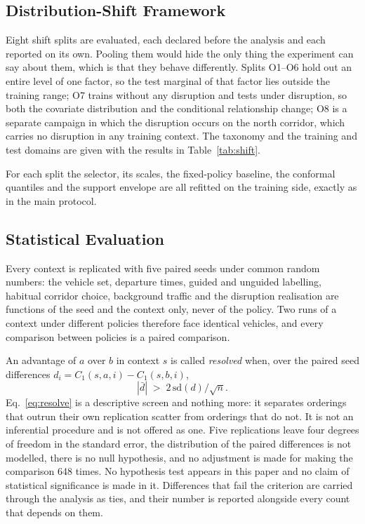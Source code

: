 \subsection{Distribution-Shift Framework}
\label{sec:method:shift}

Eight shift splits are evaluated, each declared before the analysis and each
reported on its own. Pooling them would hide the only thing the experiment can
say about them, which is that they behave differently. Splits O1--O6 hold out an
entire level of one factor, so the test marginal of that factor lies outside the
training range; O7 trains without any disruption and tests under disruption, so
both the covariate distribution and the conditional relationship change; O8 is a
separate campaign in which the disruption occurs on the north corridor, which
carries no disruption in any training context. The taxonomy and the training and
test domains are given with the results in Table~\ref{tab:shift}.

For each split the selector, its scales, the fixed-policy baseline, the conformal
quantiles and the support envelope are all refitted on the training side, exactly
as in the main protocol.

\subsection{Statistical Evaluation}
\label{sec:method:stats}

Every context is replicated with five paired seeds under common random numbers:
the vehicle set, departure times, guided and unguided labelling, habitual
corridor choice, background traffic and the disruption realisation are functions
of the seed and the context only, never of the policy. Two runs of a context
under different policies therefore face identical vehicles, and every comparison
between policies is a paired comparison.

An advantage of $a$ over $b$ in context $s$ is called \emph{resolved} when, over
the paired seed differences $d_i = C_1(s,a,i) - C_1(s,b,i)$,
\begin{equation}
|\bar d| \;>\; 2\, \mathrm{sd}(d)/\sqrt{n}.
\label{eq:resolve}
\end{equation}
Eq.~\eqref{eq:resolve} is a descriptive screen and nothing more: it separates
orderings that outrun their own replication scatter from orderings that do not.
It is not an inferential procedure and is not offered as one. Five replications
leave four degrees of freedom in the standard error, the distribution of the
paired differences is not modelled, there is no null hypothesis, and no
adjustment is made for making the comparison 648 times. No hypothesis test appears in this
paper and no claim of statistical significance is made in it. Differences that
fail the criterion are carried through the analysis as ties, and their number is
reported alongside every count that depends on them.

